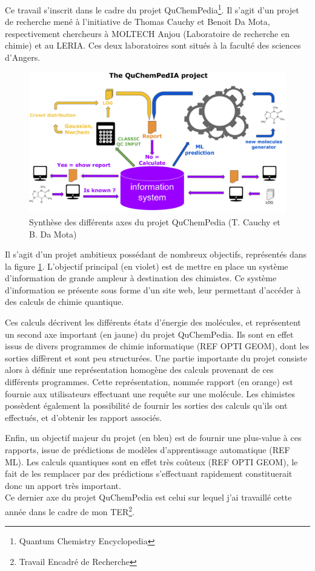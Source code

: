 \par Ce travail s'inscrit dans le cadre du projet QuChemPedia\footnote{Quantum Chemistry Encyclopedia}. Il s'agit d'un projet de recherche mené à l'initiative de Thomas Cauchy et Benoit Da Mota, respectivement chercheurs à MOLTECH Anjou (Laboratoire de recherche en chimie) et au LERIA. Ces deux laboratoires sont situés à la faculté des sciences d'Angers.\\

\begin{figure}[!h]
	\centering
	\includegraphics[scale=1]{images/part_proj.png}
	\caption{Synthèse des différents axes du projet QuChemPedia (T. Cauchy et B. Da Mota)}
	\label{figquchem}
\end{figure}

\par Il s'agit d'un projet ambitieux possédant de nombreux objectifs, représentés dans la figure \ref{figquchem}. L'objectif principal (en violet) est de mettre en place un système d'information de grande ampleur à destination des chimistes. Ce système d'information se présente sous forme d'un site web, leur permettant d'accéder à des calculs de chimie quantique.\par Ces calculs décrivent les différents états d'énergie des molécules, et représentent un second axe important (en jaune) du projet QuChemPedia. Ils sont en effet issus de divers programmes de chimie informatique (REF OPTI GEOM), dont les sorties diffèrent et sont peu structurées. Une partie importante du projet consiste alors à définir une représentation homogène des calculs provenant de ces différents programmes. Cette représentation, nommée rapport (en orange) est fournie aux utilisateurs effectuant une requête sur une molécule. Les chimistes possèdent également la possibilité de fournir les sorties des calculs qu'ils ont effectués, et d'obtenir les rapport associés.
\par Enfin, un objectif majeur du projet (en bleu) est de fournir une plus-value à ces rapports, issue de prédictions de modèles d'apprentissage automatique (REF ML). Les calculs quantiques sont en effet très coûteux (REF OPTI GEOM), le fait de les remplacer par des prédictions s'effectuant rapidement constituerait donc un apport très important.\\
Ce dernier axe du projet QuChemPedia est celui sur lequel j'ai travaillé cette année dans le cadre de mon TER\footnote{Travail Encadré de Recherche}.


